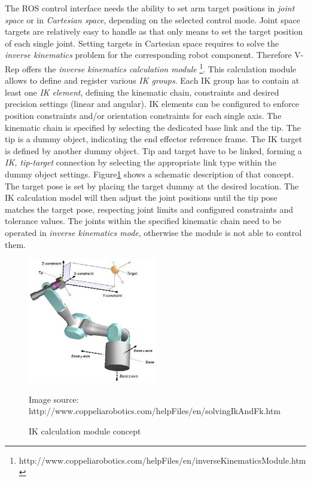 The ROS control interface needs the ability to set arm target positions in \emph{joint space} or in \emph{Cartesian space}, depending on the selected control mode. Joint space targets are relatively easy to handle as that only means to set the target position of each single joint. Setting targets in Cartesian space requires to solve the \emph{inverse kinematics} problem for the corresponding robot component. Therefore V-Rep offers the \emph{inverse kinematics calculation module} \footnote{http://www.coppeliarobotics.com/helpFiles/en/inverseKinematicsModule.htm}. 
This calculation module allows to define and register various \emph{IK groups}. Each IK group has to contain at least one \emph{IK element}, defining the kinematic chain, constraints and desired precision settings (linear and angular). IK elements can be configured to enforce position constraints and/or orientation constraints for each single axis. The kinematic chain is specified by selecting the dedicated base link and the tip. The tip is a dummy object, indicating the end effector reference frame. The IK target is defined by another dummy object. Tip and target have to be linked, forming a \emph{IK, tip-target} connection by selecting the appropriate link type within the dummy object settings. Figure\ref{fig:ik_vrep} shows a schematic description of that concept. The target pose is set by placing the target dummy at the desired location. The IK calculation model will then adjust the joint positions until the tip pose matches the target pose, respecting joint limits and configured constraints and tolerance values. The joints within the specified kinematic chain need to be operated in \emph{inverse kinematics mode}, otherwise the module is not able to control them.

\begin{figure}[ht]
	\centering
  	\includegraphics[width=0.5\textwidth]{images/ik_vrep.jpg}
	\caption{IK calculation module concept}
	{\scriptsize Image source: http://www.coppeliarobotics.com/helpFiles/en/solvingIkAndFk.htm}
	\label{fig:ik_vrep}
\end{figure}

